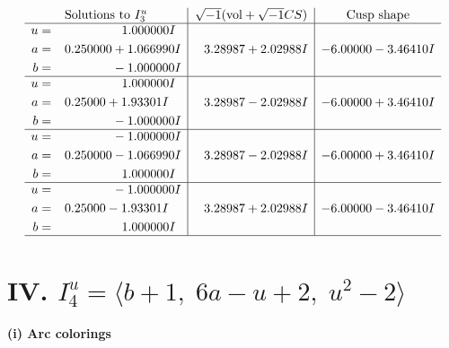 \documentclass[1p]{elsarticle_modified}
\theoremstyle{definition}
\newcommand{\I}{\sqrt{-1}}
\begin{document}
$$\begin{array}{c|c|c}  
\text{Solutions to }I^u_{3}& \I (\text{vol} + \sqrt{-1}CS) & \text{Cusp shape}\\
 \hline 
\begin{aligned}
u &= \phantom{-0.000000 -}1.000000 I \\
a &= \phantom{-}0.250000 + 1.066990 I \\
b &= \phantom{-0.000000 } -1.000000 I\end{aligned}
 & \phantom{-}3.28987 + 2.02988 I & -6.00000 - 3.46410 I \\ \hline\begin{aligned}
u &= \phantom{-0.000000 -}1.000000 I \\
a &= \phantom{-}0.25000 + 1.93301 I \\
b &= \phantom{-0.000000 } -1.000000 I\end{aligned}
 & \phantom{-}3.28987 - 2.02988 I & -6.00000 + 3.46410 I \\ \hline\begin{aligned}
u &= \phantom{-0.000000 } -1.000000 I \\
a &= \phantom{-}0.250000 - 1.066990 I \\
b &= \phantom{-0.000000 -}1.000000 I\end{aligned}
 & \phantom{-}3.28987 - 2.02988 I & -6.00000 + 3.46410 I \\ \hline\begin{aligned}
u &= \phantom{-0.000000 } -1.000000 I \\
a &= \phantom{-}0.25000 - 1.93301 I \\
b &= \phantom{-0.000000 -}1.000000 I\end{aligned}
 & \phantom{-}3.28987 + 2.02988 I & -6.00000 - 3.46410 I\\
 \hline 
 \end{array}$$\newpage\newpage\renewcommand{\arraystretch}{1}
\centering \section*{IV. $I^u_{4}= \langle b+1,\;6 a- u+2,\;u^2-2 \rangle$}
\flushleft \textbf{(i) Arc colorings}\\
\end{document}
